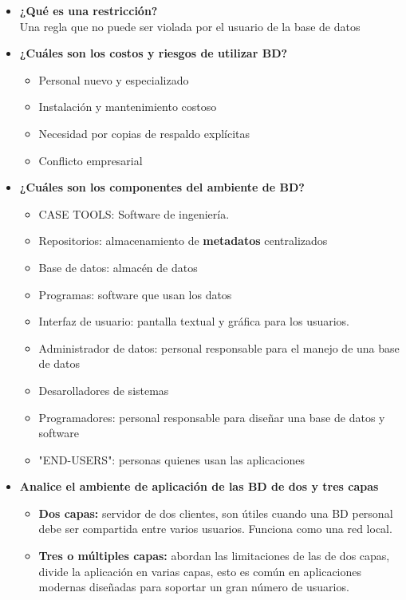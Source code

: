 \documentclass[letterpaper,12pt]{article}
\begin{document}
\begin{sloppypar}
\begin{itemize}
\begin{itemize}
        \item \textbf{¿Qué es una restricción?}\\ Una regla que no puede ser violada por el usuario de la base de datos
        \item \textbf{¿Cuáles son los costos y riesgos de utilizar BD?}
        \begin{itemize}
            \item Personal nuevo y especializado
            \item Instalación y mantenimiento costoso
            \item Necesidad por copias de respaldo explícitas
            \item Conflicto empresarial
        \end{itemize}
        \newpage
        \item \textbf{¿Cuáles son los componentes del ambiente de BD?}
        \begin{itemize}
            \item CASE TOOLS: Software de ingeniería.
            \item Repositorios: almacenamiento de \textbf{metadatos} centralizados
            \item Base de datos: almacén de datos
            \item Programas: software que usan los datos
            \item Interfaz de usuario: pantalla textual y gráfica para los usuarios.
            \item Administrador de datos: personal responsable para el manejo de una base de datos
            \item Desarolladores de sistemas
            \item Programadores: personal responsable para diseñar una base de datos y software
            \item "END-USERS": personas quienes usan las aplicaciones
        \end{itemize}
        \item \textbf{Analice el ambiente de aplicación de las BD de dos y tres capas}  
        \begin{itemize}
            \item \textbf{Dos capas:} servidor de dos clientes, son útiles cuando una BD personal debe ser compartida entre varios usuarios. Funciona como una red local.
            \item \textbf{Tres o múltiples capas:} abordan las limitaciones de las de dos capas, divide la aplicación en varias capas, esto es común en aplicaciones modernas diseñadas para soportar un gran número de usuarios.

\end{itemize}
\end{itemize}
\end{itemize}
\end{sloppypar}
\end{document}
